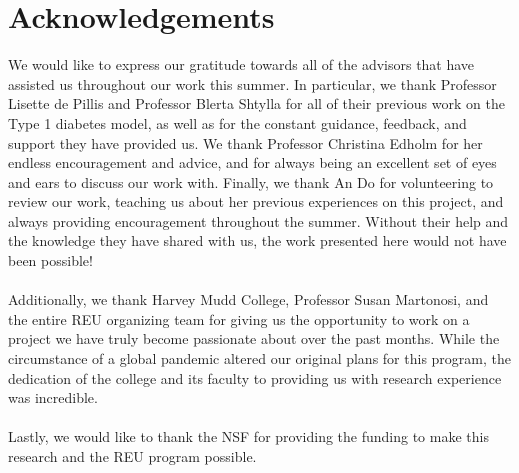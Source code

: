\section{Acknowledgements}

We would like to express our gratitude towards all of the advisors that have assisted us throughout our work this summer. In particular, we thank Professor Lisette de Pillis and Professor Blerta Shtylla for all of their previous work on the Type 1 diabetes model, as well as for the constant guidance, feedback, and support they have provided us. We thank Professor Christina Edholm for her endless encouragement and advice, and for always being an excellent set of eyes and ears to discuss our work with. Finally, we thank An Do for volunteering to review our work, teaching us about her previous experiences on this project, and always providing encouragement throughout the summer. Without their help and the knowledge they have shared with us, the work presented here would not have been possible!\\
\\
Additionally, we thank Harvey Mudd College, Professor Susan Martonosi, and the entire REU organizing team for giving us the opportunity to work on a project we have truly become passionate about over the past months. While the circumstance of a global pandemic altered our original plans for this program, the dedication of the college and its faculty to providing us with research experience was incredible.\\
\\
Lastly, we would like to thank the NSF for providing the funding to make this research and the REU program possible.